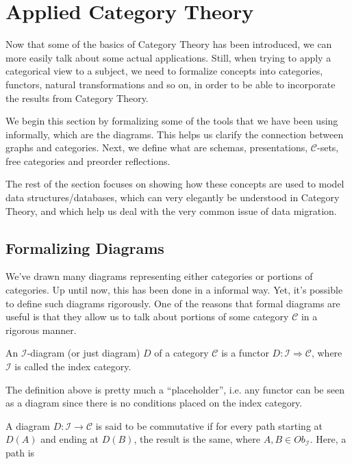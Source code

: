\section{Applied Category Theory}

Now that some of the basics of Category Theory has been introduced, we can more
easily talk about some actual applications. Still, when trying to apply a categorical
view to a subject, we need to formalize concepts into categories, functors, natural
transformations and so on, in order to be able to incorporate the results from Category Theory.

We begin this section by formalizing some of the tools that we have been using informally,
which are the diagrams.
This helps us clarify the connection between graphs and categories.
Next, we define what are schemas, presentations, $\mathcal C$-sets, free categories
and preorder reflections.

The rest of the section focuses on showing how these concepts are used to
model data structures/databases, which can very
elegantly be understood in Category Theory, and which help us deal with the very
common issue of data migration.

\subsection{Formalizing Diagrams}

We've drawn many diagrams representing either categories or portions of categories. Up
until now, this has been done in a informal way. Yet, it's possible to define such diagrams rigorously.
One of the reasons that formal diagrams are useful is that they allow us to talk about portions
of some category $\mathcal C$ in a rigorous manner.

\begin{definition}[Diagram]
  An $\mathcal I$-diagram (or just diagram) $D$ of a category $\mathcal C$ is a functor
  $D: \mathcal I \Rightarrow \mathcal C$, where $\mathcal I$ is called the index category.
\end{definition}

The definition above is pretty much a ``placeholder'', i.e. any functor can be seen as
a diagram since there is no conditions placed on the index category.

\begin{definition}
  A diagram $D:\mathcal I \to \mathcal C$ is said to be commutative if 
  for every path starting at $D(A)$ and ending at $D(B)$, the result is the same,
  where $A, B \in Ob_\mathcal I$. Here, a path is 
\end{definition}

